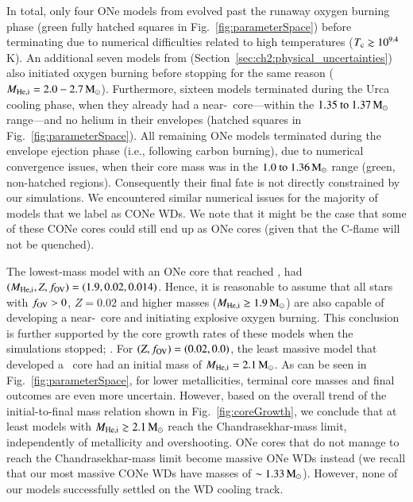 \documentclass[main.tex]{subfiles}
\begin{document}
In total, only four ONe models from \seriesone evolved past the runaway oxygen burning phase  
(green fully hatched squares in Fig.~\ref{fig:parameterSpace}) before terminating due to 
numerical difficulties related to  high  temperatures ($T_{\rm c}\gtrsim 10^{9.4}$\,K).  
An additional seven models from \seriestwo (Section~\ref{sec:ch2:physical_uncertainties}) 
also initiated oxygen burning before stopping for the same reason ($M_{\rm He, i}=2.0-2.7\mathrm{\,M_\odot}$). 
Furthermore, sixteen models terminated during the Urca cooling phase, 
when they already had a near-\mch\ core---within the $\numrange{1.35}{1.37}\msun$ range---and no helium in their envelopes (hatched squares in Fig.~\ref{fig:parameterSpace}).
All remaining \seriesone ONe models terminated during the envelope ejection phase (i.e., following carbon burning), due to numerical convergence issues, when their core mass was in 
the $\numrange{1.0}{1.36}\msun$ range (green, non-hatched regions). Consequently their final fate is not directly constrained by our simulations. We encountered similar numerical issues for the majority of models that we label as CONe WDs. We note that it might be the case that some of these CONe cores could still end up as ONe cores (given that the C-flame will not be quenched).

The lowest-mass model with an ONe core that reached \mch,  had   
$(M_{\rm He, i},Z,f_{\rm OV})=(1.9,0.02,0.014)$. Hence, it is 
reasonable to assume that all stars with $f_{\rm OV}>0$, $Z=0.02$ and  higher masses ($M_{\rm He, i}\geq 1.9\mathrm{\,M_\odot}$)  
are also capable of developing a near-\mch\ core and initiating explosive oxygen burning.
This conclusion is further supported by the core growth rates of these models when the simulations stopped; \citep[$\mdot \simeq 10^{-5}\mdotsun$; see also][]{Poelarends:2017dua}. 
For $(Z,f_{\rm OV}) = (0.02,0.0)$, the least massive model that developed a \mch\ core had an initial mass of  $M_{\rm He,i}=2.1\mathrm{\,M_\odot}$. 
As can be seen in Fig.~\ref{fig:parameterSpace}, for lower metallicities, terminal core masses and final outcomes are even more uncertain. 
However, based on the overall trend of the initial-to-final mass relation shown in Fig.~\ref{fig:coreGrowth}, we conclude that at least  models with  $M_{\rm He, i}\gtrsim 2.1\mathrm{\,M_\odot}$ reach the Chandrasekhar-mass limit,  independently of metallicity and overshooting.
ONe cores that  do not manage to reach the Chandrasekhar-mass limit  become massive ONe WDs instead (we recall that our most massive CONe WDs have masses of $\sim 1.33\mathrm{\,M_\odot}$). However, none of our models successfully settled on the WD cooling track. 
\end{document}
